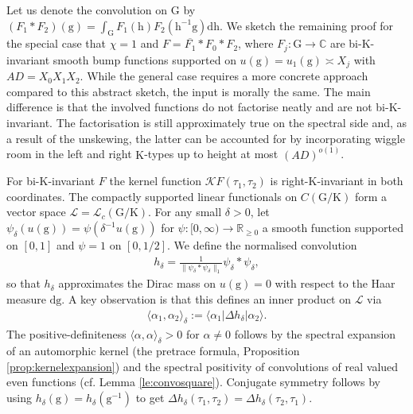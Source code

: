 \documentclass[12pt]{amsart}
\theoremstyle{definition}
\theoremstyle{remark}
\numberwithin{equation}{section}
\newcommand{\K}{\mathrm{K}}
\newcommand{\G}{\mathrm{G}}
\newcommand{\C}{{\mathbb C}}
\newcommand{\R}{{\mathbb R}}
\newcommand{\1}{{\mathbf 1}}
\newcommand{\g}{\mathrm{g}}
\newcommand{\h}{\mathrm{h}}
\renewcommand{\d}{\mathrm d}
\begin{document}
Let us denote the convolution on $\G$ by $(F_1\ast F_2) (\g) = \int_\G F_1(\h) F_2(\h^{-1} \g)\d \h $.  We sketch the remaining proof for the special case that $\chi=1$ and $F=\overline{F_1}\ast F_0\ast F_2$, where $F_j:\G \to \C$ are  bi-$\mathrm{K}$-invariant smooth bump functions supported on $u(\g) = u_1(\g) \asymp X_j$ with $AD=X_0X_1X_2$. While the general case requires a more concrete approach compared to this abstract sketch, the input is morally the same. The main difference is that the involved functions do not factorise neatly and are not bi-$\mathrm{K}$-invariant. The factorisation is still approximately true on the spectral side and, as a result of the unskewing, the latter can be accounted for by incorporating wiggle room in the left and right $\mathrm{K}$-types up to height at most $(AD)^{o(1)}$. 

For bi-$\K$-invariant $F$ the kernel function $\mathcal{K}F(\tau_1,\tau_2)$ is right-$\K$-invariant in both coordinates. The compactly supported linear functionals on $C( \G / \mathrm{K})$ form a vector space $\mathcal{L} = \mathcal{L}_c(\G/\K)$. 
For any small $\delta > 0$, let $\psi_{\delta}(u(\g)) =  \psi(\delta^{-1} u(\g)) $ for $\psi:[0,\infty) \to \R_{\geq 0}$ a smooth function supported on $[0,1]$  and $\psi=1$ on $[0,1/2]$.  We define the normalised convolution 
\begin{align*}
    h_{\delta} = \frac{1}{\|\psi_{\delta} \ast \psi_{\delta}\|_1} \psi_{\delta} \ast \psi_{\delta},
\end{align*}
so that $h_{\delta} $ approximates the Dirac mass on  $u(\g)=0$ with respect to the Haar measure $\d \g$. A key observation is that this defines an inner product on $\mathcal{L}$ via
\begin{align*}
    \langle \alpha_1,\alpha_2\rangle_{\delta} :=   \langle \alpha_1 | \Delta h_\delta | \alpha_2 \rangle.
\end{align*}
 The positive-definiteness $ \langle \alpha,\alpha\rangle_{\delta}  > 0$ for $\alpha \neq 0$ follows by the spectral expansion of an automorphic kernel (the pretrace formula, Proposition \ref{prop:kernelexpansion}) and the spectral positivity of convolutions of real valued even functions (cf. Lemma \ref{le:convosquare}). Conjugate symmetry follows by using $h_\delta(\g) =  h_\delta(\g^{-1})$ to get $\Delta h_\delta (\tau_1,\tau_2) = \Delta h_\delta (\tau_2,\tau_1)$.
\end{document}
